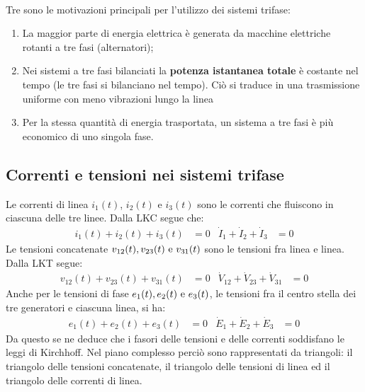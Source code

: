 \documentclass{article}
\begin{document}
\vspace*{0.2cm}\\
Tre sono le motivazioni principali per l'utilizzo dei sistemi trifase:
\begin{enumerate}
    \item La maggior parte di energia elettrica è generata da macchine elettriche rotanti a tre fasi (alternatori);
    \item Nei sistemi a tre fasi bilanciati la \textbf{potenza istantanea totale} è costante nel tempo (le tre fasi si bilanciano nel tempo). Ciò si traduce in una trasmissione uniforme con meno vibrazioni lungo la linea
    \item Per la stessa quantità di energia trasportata, un sistema a tre fasi è più
    economico di uno singola fase.
\end{enumerate}



\subsection{Correnti e tensioni nei sistemi trifase}
Le correnti di linea $i_1(t)$, $i_2(t)$ e $i_3(t)$ sono le correnti che fluiscono in ciascuna delle tre linee. Dalla LKC segue che:
\begin{align*}
    i_1(t) + i_2(t)+i_3(t)&=0 & \dot I_1 + \dot I_2 + \dot I_3 &=0
\end{align*}
Le tensioni concatenate $v_{12}(t), v_{23}(t) \text{ e } v_{31}(t)$ sono le tensioni fra linea e linea. Dalla LKT segue:
\begin{align*}
    v_{12}(t) + v_{23}(t) + v_{31}(t) &= 0 & \dot V_{12} + \dot V_{23} + \dot V_{31} &= 0
\end{align*}
Anche per le tensioni di fase $e_1 (t), e_2 (t) \text{ e } e_3(t)$, le tensioni fra il centro stella dei tre generatori e ciascuna linea, si ha:
\begin{align*}
    e_1 (t) + e_2 (t) + e_3(t) &= 0 & \dot E_1 + \dot E_2 + \dot E_3 &= 0
\end{align*}
Da questo se ne deduce che i fasori delle tensioni e delle correnti soddisfano le leggi di Kirchhoff. Nel piano complesso perciò sono rappresentati da
triangoli: il triangolo delle tensioni concatenate, il triangolo delle tensioni di linea ed il triangolo
delle correnti di linea. 
\end{document}
